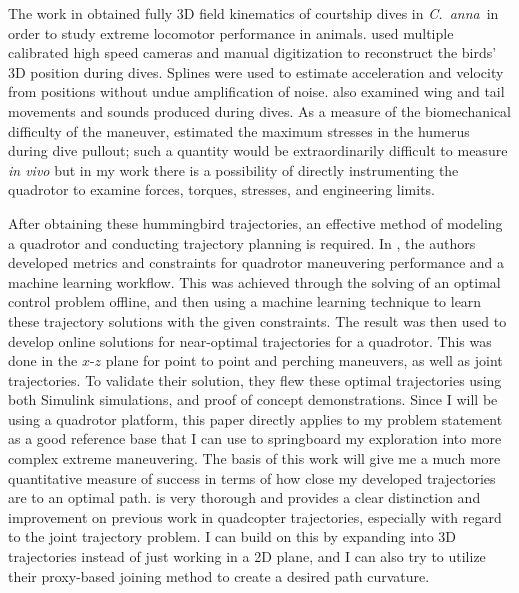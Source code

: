 \documentclass[onecolumn,10pt]{IEEEtran}
\newcommand{\Canna}{\emph{C.~anna}}
\begin{document}
The work in \cite{clark2009courtship} obtained fully 3D field kinematics of courtship dives in \Canna\ in order to study extreme locomotor performance in animals. \cite{clark2009courtship} used multiple calibrated high speed cameras and manual digitization to reconstruct the birds' 3D position during dives.  Splines were used to estimate acceleration and velocity from positions without undue amplification of noise. \cite{clark2009courtship} also examined wing and tail movements and sounds produced during dives.  As a measure of the biomechanical difficulty of the maneuver, \cite{clark2009courtship} estimated the maximum stresses in the humerus during dive pullout; such a quantity would be extraordinarily difficult to measure \emph{in vivo} but in  my work there is a possibility of directly instrumenting the quadrotor to examine forces, torques, stresses, and engineering limits. 

After obtaining these hummingbird trajectories, an effective method of modeling a quadrotor and conducting trajectory planning is required. In \cite{tomic2014learning}, the authors developed metrics and constraints for quadrotor maneuvering performance and a machine learning workflow. This was achieved through the solving of an optimal control problem offline, and then using a machine learning technique to learn these trajectory solutions with the given constraints. The result was then used to develop online solutions  for near-optimal trajectories for a quadrotor. This was done in the $x$-$z$ plane for point to point and perching maneuvers, as well as joint trajectories. To validate their solution, they flew these optimal trajectories using both Simulink simulations, and proof of concept demonstrations. Since I will be using a quadrotor platform, this paper directly applies to my problem statement as a good reference base that I can use to springboard my exploration into more complex extreme maneuvering. The basis of this work will give me a much more quantitative measure of success in terms of how close my developed trajectories are to an optimal path. \cite{tomic2014learning} is very thorough and provides a clear distinction and improvement on previous work in quadcopter trajectories, especially with regard to the joint trajectory problem. I can build on this by expanding into 3D trajectories instead of just working in a 2D plane, and I can also try to utilize their proxy-based joining method to create a desired path curvature.
\end{document}
